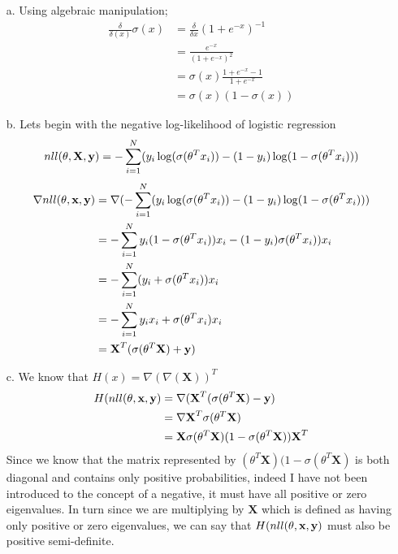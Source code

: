 \documentclass[12pt,letterpaper]{hmcpset}
\newcommand{\XX}{\textbf{X}}
\begin{document}
\begin{solution}
	\begin{enumerate}
	\item[a.] Using algebraic manipulation;
	\begin{align*}
	\frac{\delta}{\delta(x)}\sigma(x) &=\frac{\delta}{\delta x} (1+e^{-x})^{-1} \\
	&=\frac{e^{-x}}{(1+e^{-x})^2}\\
	&=\sigma(x)\frac{1+e^{-x}-1}{1+e^{-x}}\\
	&= \sigma(x)(1-\sigma(x))
	\end{align*}
	\item[b.] Lets begin with the negative log-likelihood of logistic regression $$nll(\theta, \XX, \yy) = - \sum_{i=1}^N (y_i\log(\sigma(\theta^Tx_i))-(1-y_i)\log(1-\sigma(\theta^Tx_i)))$$
	\begin{align*}
	\nabla nll(\theta,\xx,\yy) &= \nabla ( - \sum_{i=1}^N (y_i\log(\sigma(\theta^Tx_i))-(1-y_i)\log(1-\sigma(\theta^Tx_i)))\\
	&= - \sum_{i=1}^N y_i (1-\sigma(\theta^Tx_i))x_i
	-(1-y_i)\sigma(\theta^Tx_i))x_i\\
	&= - \sum_{i=1}^N (y_i +\sigma(\theta^Tx_i))x_i\\
	&=- \sum_{i=1}^N y_ix_i +\sigma(\theta^Tx_i)x_i\\
	&= \XX^T(\sigma(\theta ^T \XX) +\yy)
	\end{align*}
	\item[c.] We know that $H(x) = \nabla (\nabla (\XX))^T$
	\begin{align*}
	H(nll(\theta,\xx,\yy) &= \nabla (\XX^T(\sigma(\theta ^T \XX) -\yy)\\
	&=\nabla \XX^T\sigma(\theta ^T \XX)\\
	&=\XX \sigma(\theta ^T \XX)(1-\sigma(\theta ^T \XX)) \XX^T
	\end{align*}
	Since we know that the matrix represented by $(\theta ^T \XX)(1-\sigma(\theta ^T \XX)$ is both diagonal and contains only positive probabilities, indeed I have not been introduced to the concept of a negative, it must have all positive or zero eigenvalues. In turn since we are multiplying by $\XX$ which is defined as having only positive or zero eigenvalues, we can say that $H(nll(\theta,{\bf x},{\bf y})$ must also be positive semi-definite. 
	\end{enumerate}
\end{solution}
\end{document}
